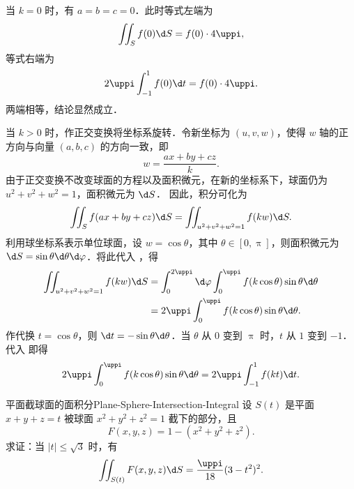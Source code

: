 \begin{myproof}
    当 $k = 0$ 时，有 $a = b = c = 0$．此时等式左端为
    \begin{equation}
        \label{eq:k0-left-1}
        \iint_{S} f(0) \d S = f(0) \cdot 4 \uppi,
    \end{equation}
    等式右端为
    \begin{equation}
        \label{eq:k0-right-1}
        2 \uppi \int_{-1}^{1} f(0) \d t = f(0) \cdot 4 \uppi.
    \end{equation}
    两端相等，结论显然成立．

    当 $k > 0$ 时，作正交变换将坐标系旋转．令新坐标为 $(u, v, w)$，使得 $w$ 轴的正方向与向量 $(a, b, c)$ 的方向一致，即
    \begin{equation}
        \label{eq:w-def-1}
        w = \frac{ax + by + cz}{k}.
    \end{equation}
    由于正交变换不改变球面的方程以及面积微元，在新的坐标系下，球面仍为 $u^2 + v^2 + w^2 = 1$，面积微元为 $\d S$．
    因此，积分可化为
    \begin{equation}
        \label{eq:rot-integral-1}
        \iint_{S} f(ax + by + cz) \d S = \iint_{u^2 + v^2 + w^2 = 1} f(kw) \d S.
    \end{equation}
    利用球坐标系表示单位球面，设 $w = \cos \theta$，其中 $\theta \in [0, \uppi]$，则面积微元为 $\d S = \sin \theta \d \theta \d \varphi$．将此代入 ，得
    \begin{equation}
        \label{eq:spherical-calc-1}
        \begin{aligned}
            \iint_{u^2 + v^2 + w^2 = 1} f(kw) \d S & = \int_{0}^{2\uppi} \d \varphi \int_{0}^{\uppi} f(k \cos \theta) \sin \theta \d \theta \\
                                                   & = 2 \uppi \int_{0}^{\uppi} f(k \cos \theta) \sin \theta \d \theta.
        \end{aligned}
    \end{equation}
    作代换 $t = \cos \theta$，则 $\d t = -\sin \theta \d \theta$．当 $\theta$ 从 $0$ 变到 $\uppi$ 时，$t$ 从 $1$ 变到 $-1$．代入  即得
    \begin{equation}
        2 \uppi \int_{0}^{\uppi} f(k \cos \theta) \sin \theta \d \theta = 2 \uppi \int_{-1}^{1} f(kt) \d t.
    \end{equation}
\end{myproof}

\begin{problem}{平面截球面的面积分}{Plane-Sphere-Intersection-Integral}
    设 $S(t)$ 是平面 $x + y + z = t$ 被球面 $x^2 + y^2 + z^2 = 1$ 截下的部分，且
    \begin{equation*}
        F(x, y, z) = 1 - (x^2 + y^2 + z^2).
    \end{equation*}
    求证：当 $|t| \le \sqrt{3}$ 时，有
    \begin{equation*}
        \iint_{S(t)} F(x, y, z) \d S = \frac{\uppi}{18}(3 - t^2)^2.
    \end{equation*}
\end{problem}


